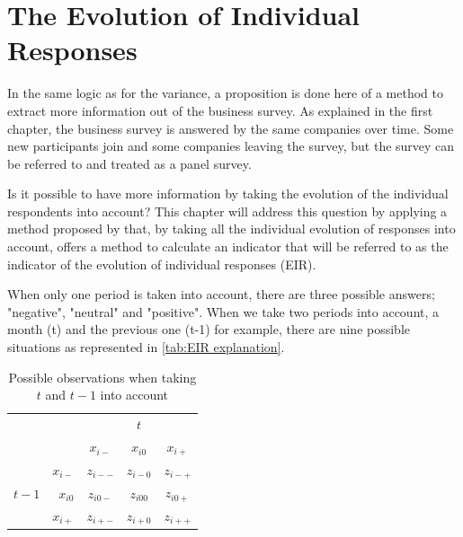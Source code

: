 \documentclass[12pt,a4paper,oneside]{book}
\begin{document}
\chapter{The Evolution of Individual Responses}

In the same logic as for the variance, a proposition is done here of a method to extract more information out of the business survey. 
As explained in the first chapter, the business survey is answered by the same companies over time. Some new participants join and some companies leaving the survey, but the survey can be referred to and treated as a panel survey.

Is it possible to have more information by taking the evolution of the individual respondents into account? 
This chapter will address this question by applying a method proposed by \cite{caron_estimation_1996} that, by taking all the individual evolution of responses into account, offers a method to calculate an indicator that will be referred to as the indicator of the evolution of individual responses (EIR).


When only one period is taken into account, there are three possible answers; "negative", "neutral" and "positive".
When we take two periods into account, a month (t) and the previous one (t-1) for example, there are nine possible situations as represented in \autoref{tab:EIR explanation}. 


\begin{table}[htp!]
    \caption{Possible observations when taking $t$ and $t-1$ into account}
    \label{tab:EIR explanation}
     \centering \footnotesize
    \begin{tabular}{r | r | c c c | }
    \multicolumn{1}{r}{} & \multicolumn{1}{r}{} &    \multicolumn{3}{c}{$t$} \\ \cline{3-5}
    \multicolumn{1}{r}{} &         & \textbf{$x_{i-}$} & \textbf{$x_{i0}$} & \textbf{$x_{i+}$} \\ \cline{2-5}
          &    \textbf{$x_{i-}$} & $z_{i--}$    & $z_{i-0}$    & $z_{i-+}$ \\ 
    $t-1$ & \textbf{$x_{i0}$}  & $z_{i0-}$    & $z_{i00}$    & $z_{i0+}$ \\
          &    \textbf{$x_{i+}$} & $z_{i+-}$    & $z_{i+0}$    & $z_{i++}$ \\ \cline{2-5}
    \end{tabular}
\end{table}
\end{document}
